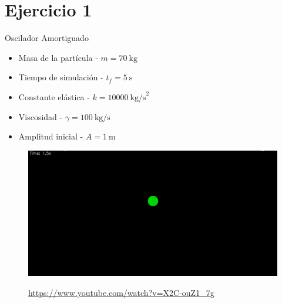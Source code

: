 \section{Ejercicio 1}\label{sec:ejercicio1}

\begin{frame}{Oscilador Amortiguado}
    \begin{multicols}{2}
        {
        \begin{itemize}
            \item Masa de la partícula - $m = 70\ \text{kg}$
            \item Tiempo de simulación - $t_f = 5\ \text{s}$
            \item Constante elástica - $k = 10000\ \text{kg/s}^2$
            \item Viscosidad - $\gamma = 100\ \text{kg/s}$
            \item Amplitud inicial - $A = 1\ \text{m}$
        \end{itemize}
        }
        {
        \begin{figure}[H]
            \centering
            \includegraphics[width=1\linewidth]{pic/00-ejercicio1/thumbnail.png}\\
            \captionsetup{labelformat=empty}
            \caption{\href{https://www.youtube.com/watch?v=X2C-ouZ1_7g}{https://www.youtube.com/watch?v=X2C-ouZ1\_7g}}
        \end{figure}
        }
    \end{multicols}
\end{frame}


